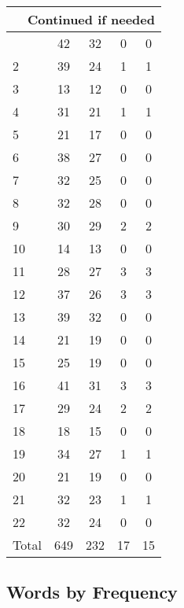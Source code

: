 \begin{center}
\begin{longtable}{l|c|c|c|c}
\hline \multicolumn{5}{|r|}{{Continued if needed}} \\ \hline
\endfoot 
1 & 42 & 32 & 0 & 0\\ \hline
2 & 39 & 24 & 1 & 1\\ \hline
3 & 13 & 12 & 0 & 0\\ \hline
4 & 31 & 21 & 1 & 1\\ \hline
5 & 21 & 17 & 0 & 0\\ \hline
6 & 38 & 27 & 0 & 0\\ \hline
7 & 32 & 25 & 0 & 0\\ \hline
8 & 32 & 28 & 0 & 0\\ \hline
9 & 30 & 29 & 2 & 2\\ \hline
10 & 14 & 13 & 0 & 0\\ \hline
11 & 28 & 27 & 3 & 3\\ \hline
12 & 37 & 26 & 3 & 3\\ \hline
13 & 39 & 32 & 0 & 0\\ \hline
14 & 21 & 19 & 0 & 0\\ \hline
15 & 25 & 19 & 0 & 0\\ \hline
16 & 41 & 31 & 3 & 3\\ \hline
17 & 29 & 24 & 2 & 2\\ \hline
18 & 18 & 15 & 0 & 0\\ \hline
19 & 34 & 27 & 1 & 1\\ \hline
20 & 21 & 19 & 0 & 0\\ \hline
21 & 32 & 23 & 1 & 1\\ \hline
22 & 32 & 24 & 0 & 0\\ \hline
\hline \hline
Total & 649 & 232 & 17 & 15



\end{longtable}
\end{center}

 
\subsection{Words by Frequency}

